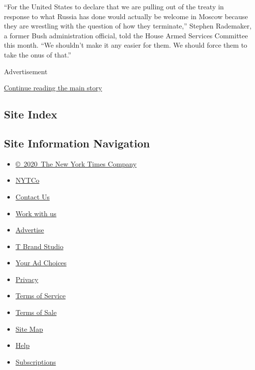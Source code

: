 ``For the United States to declare that we are pulling out of the treaty
in response to what Russia has done would actually be welcome in Moscow
because they are wrestling with the question of how they terminate,''
Stephen Rademaker, a former Bush administration official, told the House
Armed Services Committee this month. ``We shouldn't make it any easier
for them. We should force them to take the onus of that.''

Advertisement

\protect\hyperlink{after-bottom}{Continue reading the main story}

\hypertarget{site-index}{%
\subsection{Site Index}\label{site-index}}

\hypertarget{site-information-navigation}{%
\subsection{Site Information
Navigation}\label{site-information-navigation}}

\begin{itemize}
\tightlist
\item
  \href{https://help.nytimes.com/hc/en-us/articles/115014792127-Copyright-notice}{©~2020~The
  New York Times Company}
\end{itemize}

\begin{itemize}
\tightlist
\item
  \href{https://www.nytco.com/}{NYTCo}
\item
  \href{https://help.nytimes.com/hc/en-us/articles/115015385887-Contact-Us}{Contact
  Us}
\item
  \href{https://www.nytco.com/careers/}{Work with us}
\item
  \href{https://nytmediakit.com/}{Advertise}
\item
  \href{http://www.tbrandstudio.com/}{T Brand Studio}
\item
  \href{https://www.nytimes.com/privacy/cookie-policy\#how-do-i-manage-trackers}{Your
  Ad Choices}
\item
  \href{https://www.nytimes.com/privacy}{Privacy}
\item
  \href{https://help.nytimes.com/hc/en-us/articles/115014893428-Terms-of-service}{Terms
  of Service}
\item
  \href{https://help.nytimes.com/hc/en-us/articles/115014893968-Terms-of-sale}{Terms
  of Sale}
\item
  \href{https://spiderbites.nytimes.com}{Site Map}
\item
  \href{https://help.nytimes.com/hc/en-us}{Help}
\item
  \href{https://www.nytimes.com/subscription?campaignId=37WXW}{Subscriptions}
\end{itemize}
